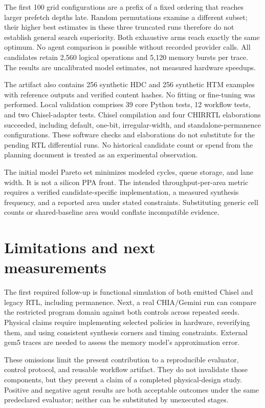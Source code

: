\documentclass[conference]{IEEEtran}
\begin{document}
The first 100 grid configurations are a prefix of a fixed ordering that reaches
larger prefetch depths late. Random permutations examine a different subset;
their higher best estimates in these three truncated runs therefore do not
establish general search superiority. Both exhaustive arms reach exactly the
same optimum. No agent comparison is possible without recorded provider calls.
All candidates retain 2,560 logical operations and 5,120 memory bursts per trace.
The results are uncalibrated model estimates, not measured hardware speedups.

The artifact also contains 256 synthetic HDC and 256 synthetic HTM examples
with reference outputs and verified content hashes. No fitting or fine-tuning
was performed. Local validation comprises 39 core Python tests, 12 workflow
tests, and two Chisel-adapter tests. Chisel compilation and four CHIRRTL elaborations succeeded, including
default, one-bit, irregular-width, and standalone-permanence configurations.
These software checks and elaborations do not substitute for the pending RTL
differential runs. No historical candidate count or spend from the planning
document is treated as an experimental observation.

The initial model Pareto set minimizes modeled cycles, queue storage, and lane
width. It is not a silicon PPA front. The intended throughput-per-area metric
requires a verified candidate-specific implementation, a measured synthesis
frequency, and a reported area under stated constraints. Substituting generic
cell counts or shared-baseline area would conflate incompatible evidence.

\section{Limitations and next measurements}
The first required follow-up is functional simulation of both emitted Chisel
and legacy RTL, including permanence. Next, a real CHIA/Gemini run can compare
the restricted program domain against both controls across repeated seeds.
Physical claims require implementing selected policies in hardware, reverifying
them, and using consistent synthesis corners and timing constraints. External
gem5 traces are needed to assess the memory model's approximation error.

These omissions limit the present contribution to a reproducible evaluator,
control protocol, and reusable workflow artifact. They do not invalidate those
components, but they prevent a claim of a completed physical-design study.
Positive and negative agent results are both acceptable outcomes under the
same predeclared evaluator; neither can be substituted by unexecuted stages.
\end{document}
